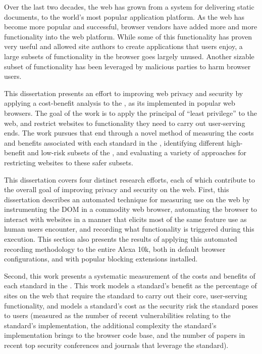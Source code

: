 \summary
Over the last two decades, the web has grown from a system for delivering
static documents, to the world's most popular application platform.  As the
web has become more popular and successful, browser vendors have added more
and more functionality into the web platform.
While some of this functionality has proven very useful and allowed site
authors to create applications that users enjoy, a large subsets of functionality
in the browser goes largely unused.  Another sizable subset of functionality
has been leveraged by malicious parties to harm browser users.

This dissertation presents an effort to improving web privacy and security
by applying a cost-benefit analysis to the \WAPI, as its implemented in
popular web browsers.  The goal of the work is to apply the principal of
``least privilege'' to the web, and restrict websites to functionality
they need to carry out user-serving ends.  The work pursues that
end through a novel method of measuring the costs and benefits associated with
each standard in the \WAPI, identifying different high-benefit and low-risk
subsets of the \WAPI, and evaluating a variety of approaches for
restricting websites to these safer subsets.

This dissertation covers four distinct research efforts, each of which contribute
to the overall goal of improving privacy and security on the web.  First,
this dissertation describes an automated technique for measuring \WAPI use on the web by
instrumenting the DOM in a commodity web browser, automating the browser
to interact with websites in a manner that elicits most of the same
feature use as human users encounter, and recording what functionality is
triggered during this execution.  This section also presents the results of
applying this automated recording methodology to the entire Alexa 10k, both
in default browser configurations, and with popular blocking extensions installed.

Second, this work presents a systematic measurement of the costs and benefits of
each standard in the \WAPI.  This work models a standard's benefit
as the percentage of sites on the web that require the standard to carry out
their core, user-serving functionality, and models a standard's cost as
the security risk the standard poses to users (measured as the number of
recent vulnerabilities relating to the standard's implementation, the additional
complexity the standard's implementation brings to the browser code base, and
the number of papers in recent top security conferences and journals that
leverage the standard).

